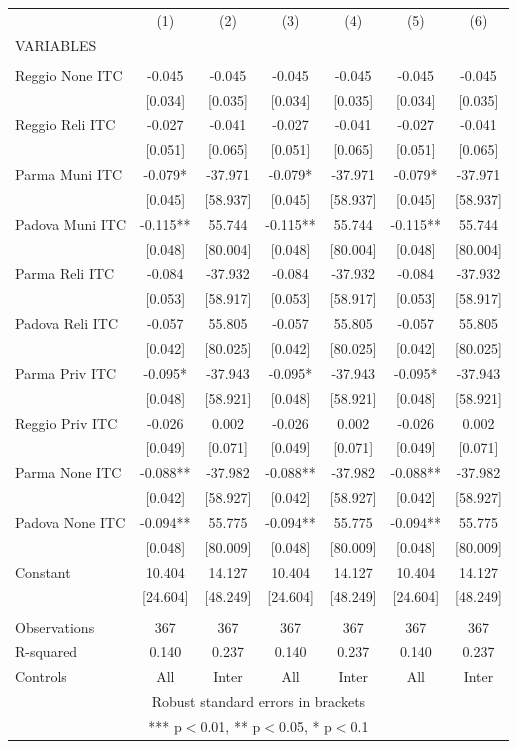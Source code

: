 \begin{tabular}{lcccccc} \hline
 & (1) & (2) & (3) & (4) & (5) & (6) \\
VARIABLES &  &  &  &  &  &  \\ \hline
 &  &  &  &  &  &  \\
Reggio None ITC & -0.045 & -0.045 & -0.045 & -0.045 & -0.045 & -0.045 \\
 & [0.034] & [0.035] & [0.034] & [0.035] & [0.034] & [0.035] \\
Reggio Reli ITC & -0.027 & -0.041 & -0.027 & -0.041 & -0.027 & -0.041 \\
 & [0.051] & [0.065] & [0.051] & [0.065] & [0.051] & [0.065] \\
Parma Muni ITC & -0.079* & -37.971 & -0.079* & -37.971 & -0.079* & -37.971 \\
 & [0.045] & [58.937] & [0.045] & [58.937] & [0.045] & [58.937] \\
Padova Muni ITC & -0.115** & 55.744 & -0.115** & 55.744 & -0.115** & 55.744 \\
 & [0.048] & [80.004] & [0.048] & [80.004] & [0.048] & [80.004] \\
Parma Reli ITC & -0.084 & -37.932 & -0.084 & -37.932 & -0.084 & -37.932 \\
 & [0.053] & [58.917] & [0.053] & [58.917] & [0.053] & [58.917] \\
Padova Reli ITC & -0.057 & 55.805 & -0.057 & 55.805 & -0.057 & 55.805 \\
 & [0.042] & [80.025] & [0.042] & [80.025] & [0.042] & [80.025] \\
Parma Priv ITC & -0.095* & -37.943 & -0.095* & -37.943 & -0.095* & -37.943 \\
 & [0.048] & [58.921] & [0.048] & [58.921] & [0.048] & [58.921] \\
Reggio Priv ITC & -0.026 & 0.002 & -0.026 & 0.002 & -0.026 & 0.002 \\
 & [0.049] & [0.071] & [0.049] & [0.071] & [0.049] & [0.071] \\
Parma None ITC & -0.088** & -37.982 & -0.088** & -37.982 & -0.088** & -37.982 \\
 & [0.042] & [58.927] & [0.042] & [58.927] & [0.042] & [58.927] \\
Padova None ITC & -0.094** & 55.775 & -0.094** & 55.775 & -0.094** & 55.775 \\
 & [0.048] & [80.009] & [0.048] & [80.009] & [0.048] & [80.009] \\
Constant & 10.404 & 14.127 & 10.404 & 14.127 & 10.404 & 14.127 \\
 & [24.604] & [48.249] & [24.604] & [48.249] & [24.604] & [48.249] \\
 &  &  &  &  &  &  \\
Observations & 367 & 367 & 367 & 367 & 367 & 367 \\
R-squared & 0.140 & 0.237 & 0.140 & 0.237 & 0.140 & 0.237 \\
 Controls & All & Inter & All & Inter & All & Inter \\ \hline
\multicolumn{7}{c}{ Robust standard errors in brackets} \\
\multicolumn{7}{c}{ *** p$<$0.01, ** p$<$0.05, * p$<$0.1} \\
\end{tabular}
